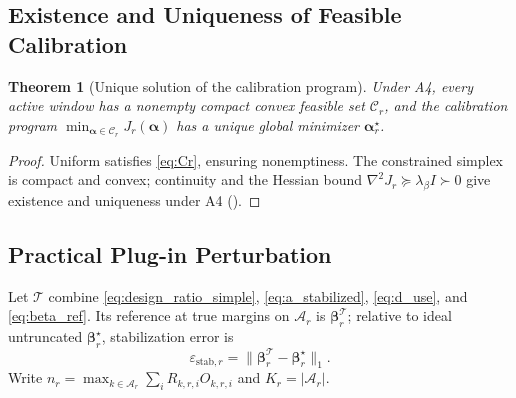 \documentclass[letterpaper,journal]{IEEEtran}
\newtheorem{theorem}{Theorem}
\begin{document}
\subsection{Existence and Uniqueness of Feasible Calibration}
\label{subsec:theorem_calibration}

\begin{theorem}[Unique solution of the calibration program]
\label{thm:calibration}
Under A4, every active window has a nonempty compact convex feasible set
$\mathcal{C}_r$, and the calibration program
$\min_{\boldsymbol\alpha\in\mathcal{C}_r}J_r(\boldsymbol\alpha)$
has a unique global minimizer $\boldsymbol\alpha_r^\star$.
\end{theorem}

\begin{proof}
Uniform satisfies \eqref{eq:Cr}, ensuring nonemptiness. The constrained simplex
is compact and convex; continuity and the Hessian bound
$\nabla^2J_r\succeq\lambda_\beta I\succ0$ give existence and uniqueness under A4
().
\end{proof}

\subsection{Practical Plug-in Perturbation}
\label{subsec:prop_plugin}

Let $\mathcal T$ combine \eqref{eq:design_ratio_simple},
\eqref{eq:a_stabilized}, \eqref{eq:d_use}, and \eqref{eq:beta_ref}.
Its reference at true margins on $\mathcal A_r$ is
$\boldsymbol\beta_r^{\mathcal T}$; relative to ideal untruncated
$\boldsymbol\beta_r^\star$, stabilization error is
\begin{equation}
\varepsilon_{\mathrm{stab},r}
=
\bigl\|\boldsymbol\beta_r^{\mathcal T}-\boldsymbol\beta_r^\star\bigr\|_1 .
\label{eq:eps_stab}
\end{equation}
Write $n_r=\max_{k\in\mathcal A_r}\sum_iR_{k,r,i}O_{k,r,i}$ and
$K_r=|\mathcal A_r|$.
\end{document}
